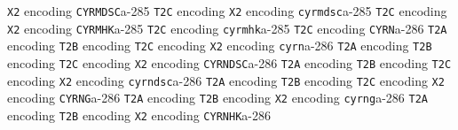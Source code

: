 \documentclass[twoside]{ltxdoc}
\makeatletter
\renewenvironment{theindex}{%
   \@restonecoltrue
   \if@twocolumn\@restonecolfalse\fi
   \columnseprule \z@
   \columnsep 35\p@
   \twocolumn[\index@prologue]%
   \IndexParms
   \let\item\@idxitem
   \ignorespaces
}{\if@restonecol\onecolumn\else\clearpage\fi}
\makeatother
\begin{document}
\begin{theindex}
    \subitem \texttt  {X2} encoding\pfill {}
  \item \texttt  {CYRMDSC}\pfill a-285
    \subitem \texttt  {T2C} encoding\pfill {}
    \subitem \texttt  {X2} encoding\pfill {}
  \item \texttt  {cyrmdsc}\pfill a-285
    \subitem \texttt  {T2C} encoding\pfill {}
    \subitem \texttt  {X2} encoding\pfill {}
  \item \texttt  {CYRMHK}\pfill a-285
    \subitem \texttt  {T2C} encoding\pfill {}
  \item \texttt  {cyrmhk}\pfill a-285
    \subitem \texttt  {T2C} encoding\pfill {}
  \item \texttt  {CYRN}\pfill a-286
    \subitem \texttt  {T2A} encoding\pfill {}
    \subitem \texttt  {T2B} encoding\pfill {}
    \subitem \texttt  {T2C} encoding\pfill {}
    \subitem \texttt  {X2} encoding\pfill {}
  \item \texttt  {cyrn}\pfill a-286
    \subitem \texttt  {T2A} encoding\pfill {}
    \subitem \texttt  {T2B} encoding\pfill {}
    \subitem \texttt  {T2C} encoding\pfill {}
    \subitem \texttt  {X2} encoding\pfill {}
  \item \texttt  {CYRNDSC}\pfill a-286
    \subitem \texttt  {T2A} encoding\pfill {}
    \subitem \texttt  {T2B} encoding\pfill {}
    \subitem \texttt  {T2C} encoding\pfill {}
    \subitem \texttt  {X2} encoding\pfill {}
  \item \texttt  {cyrndsc}\pfill a-286
    \subitem \texttt  {T2A} encoding\pfill {}
    \subitem \texttt  {T2B} encoding\pfill {}
    \subitem \texttt  {T2C} encoding\pfill {}
    \subitem \texttt  {X2} encoding\pfill {}
  \item \texttt  {CYRNG}\pfill a-286
    \subitem \texttt  {T2A} encoding\pfill {}
    \subitem \texttt  {T2B} encoding\pfill {}
    \subitem \texttt  {X2} encoding\pfill {}
  \item \texttt  {cyrng}\pfill a-286
    \subitem \texttt  {T2A} encoding\pfill {}
    \subitem \texttt  {T2B} encoding\pfill {}
    \subitem \texttt  {X2} encoding\pfill {}
  \item \texttt  {CYRNHK}\pfill a-286

\end{theindex}
\end{document}
